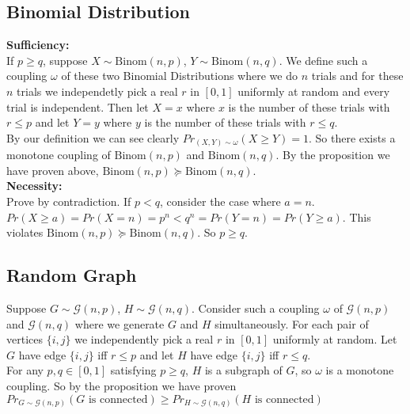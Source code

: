 \documentclass[12pt,letterpaper]{article}
\begin{document}
\subsection{Binomial Distribution}
\textbf{Sufficiency:}\\
If $p\geq q$, suppose $X\sim\text{Binom}(n,p)$, $Y\sim\text{Binom}(n,q)$. We define such a coupling $\omega$ of these two Binomial Distributions where we do $n$ trials and for these $n$ trials we independetly pick a real $r$ in $[0,1]$ uniformly at random and every trial is independent. Then let $X=x$ where $x$ is the number of these trials with $r\leq p$ and let $Y=y$ where $y$ is the number of these trials with $r\leq q$.\\
By our definition we can see clearly $Pr_{(X,Y)\sim\omega}(X\geq Y)=1$. So there exists a monotone coupling of $\text{Binom}(n,p)$ and $\text{Binom}(n,q)$. By the proposition we have proven above, $\text{Binom}(n,p)\succeq\text{Binom}(n,q)$.\\
\textbf{Necessity:}\\
Prove by contradiction. If $p<q$, consider the case where $a=n$. $Pr(X\geq a)=Pr(X=n)=p^n<q^n=Pr(Y=n)=Pr(Y\geq a)$. This violates $\text{Binom}(n,p)\succeq\text{Binom}(n,q)$. So $p\geq q$.
\subsection{Random Graph}
Suppose $G\sim\mathcal{G}(n,p)$, $H\sim\mathcal{G}(n,q)$. Consider such a coupling $\omega$ of $\mathcal{G}(n,p)$ and $\mathcal{G}(n,q)$ where we generate $G$ and $H$ simultaneously. For each pair of vertices $\{i,j\}$ we independently pick a real $r$ in $[0,1]$ uniformly at random. Let $G$ have edge $\{i,j\}$ iff $r\leq p$ and let $H$ have edge $\{i,j\}$ iff $r\leq q$.\\ 
For any $p,q\in[0,1]$ satisfying $p\geq q$, $H$ is a subgraph of $G$, so $\omega$ is a monotone coupling. So by the proposition we have proven $Pr_{G\sim\mathcal{G}(n,p)}(G\text{ is connected})\geq Pr_{H\sim\mathcal{G}(n,q)}(H\text{ is connected})$

\newpage
\end{document}
